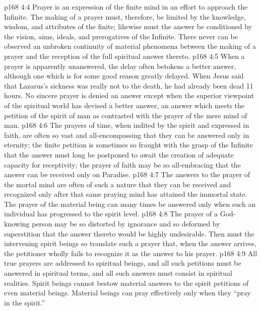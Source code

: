 \vs p168 4:4 \bibnobreakspace Prayer is an expression of the finite mind in an effort to approach the Infinite. The making of a prayer must, therefore, be limited by the knowledge, wisdom, and attributes of the finite; likewise must the answer be conditioned by the vision, aims, ideals, and prerogatives of the Infinite. There never can be observed an unbroken continuity of material phenomena between the making of a prayer and the reception of the full spiritual answer thereto.
\vs p168 4:5 \bibnobreakspace When a prayer is apparently unanswered, the delay often betokens a better answer, although one which is for some good reason greatly delayed. When Jesus said that Lazarus’s sickness was really not to the death, he had already been dead 11 hours. No sincere prayer is denied an answer except when the superior viewpoint of the spiritual world has devised a better answer, an answer which meets the petition of the spirit of man as contrasted with the prayer of the mere mind of man.
\vs p168 4:6 \bibnobreakspace The prayers of time, when indited by the spirit and expressed in faith, are often so vast and all\hyp{}encompassing that they can be answered only in eternity; the finite petition is sometimes so fraught with the grasp of the Infinite that the answer must long be postponed to await the creation of adequate capacity for receptivity; the prayer of faith may be so all\hyp{}embracing that the answer can be received only on Paradise.
\vs p168 4:7 \bibnobreakspace The answers to the prayer of the mortal mind are often of such a nature that they can be received and recognized only after that same praying mind has attained the immortal state. The prayer of the material being can many times be answered only when such an individual has progressed to the spirit level.
\vs p168 4:8 \bibnobreakspace The prayer of a God\hyp{}knowing person may be so distorted by ignorance and so deformed by superstition that the answer thereto would be highly undesirable. Then must the intervening spirit beings so translate such a prayer that, when the answer arrives, the petitioner wholly fails to recognize it as the answer to his prayer.
\vs p168 4:9 \bibnobreakspace All true prayers are addressed to spiritual beings, and all such petitions must be answered in spiritual terms, and all such answers must consist in spiritual realities. Spirit beings cannot bestow material answers to the spirit petitions of even material beings. Material beings can pray effectively only when they “pray in the spirit.”
